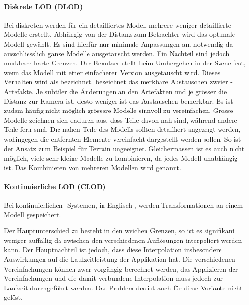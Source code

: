 \paragraph{Diskrete LOD (DLOD)}
Bei diskreten  werden für ein detailliertes Modell mehrere weniger detaillierte Modelle erstellt.
Abhängig von der Distanz zum Betrachter wird das optimale Modell gewählt. Es sind hierfür nur minimale Anpassungen am  notwendig da ausschliesslich ganze Modelle ausgetauscht werden.
Ein Nachteil sind jedoch merkbare harte Grenzen. Der Benutzer stellt beim Umhergehen in der Szene fest, wenn das Modell mit einer einfacheren Version ausgetauscht wird.
Dieses Verhalten wird als  bezeichnet.  bezeichnet das merkbare Austauschen zweier -Artefakte. Je subtiler die Änderungen an den Artefakten und je grösser die Distanz zur Kamera ist, desto weniger ist das Austauschen bemerkbar.
Es ist zudem häufig nicht möglich grössere Modelle sinnvoll zu vereinfachen. Grosse Modelle zeichnen sich dadurch aus, dass Teile davon nah sind, während andere Teile fern sind. Die nahen Teile des Modells sollten detailliert angezeigt werden, wohingegen die entfernten Elemente vereinfacht dargestellt werden sollen. So ist der Ansatz zum Beispiel für Terrain ungeeignet. Gleichermassen ist es auch nicht möglich, viele sehr kleine Modelle zu kombinieren, da jedes Modell unabhängig ist. Das Kombinieren von mehreren Modellen wird  genannt.

\paragraph{Kontinuierliche LOD (CLOD)}
Bei kontinuierlichen -Systemen, in Englisch , werden Transformationen an einem Modell gespeichert.

Der Hauptunterschied zu  besteht in den weichen Grenzen, so ist es signifikant weniger auffällig da zwischen den verschiedenen Auflösungen interpoliert werden kann.
Der Hauptnachteil ist jedoch, dass diese Interpolation insbesondere Auswirkungen auf die Laufzeitleistung der Applikation hat. Die verschiedenen Vereinfachungen können zwar vorgängig berechnet werden, das Applizieren der Vereinfachungen und die damit verbundene Interpolation muss jedoch zur Laufzeit durchgeführt werden.
Das Problem des  ist auch für diese Variante nicht gelöst.

